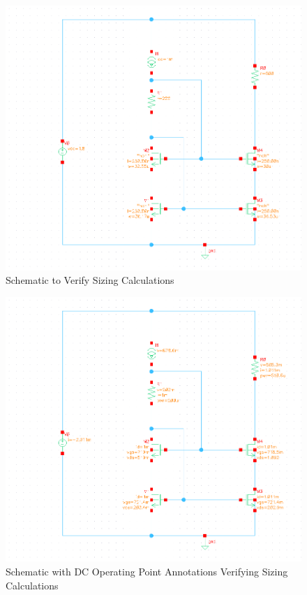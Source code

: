 \documentclass{article}
\begin{document}
\begin{figure}[H]
\centering
\includegraphics[width=6in]{p2_4_schem.png}
\caption{Schematic to Verify Sizing Calculations}
\label{2_4_schem}
\end{figure}


\begin{figure}[H]
\centering
\includegraphics[width=6in]{p2_4_dcop.png}
\caption{Schematic with DC Operating Point Annotations Verifying Sizing Calculations}
\label{2_4_dcop}
\end{figure}
\newpage
\end{document}

